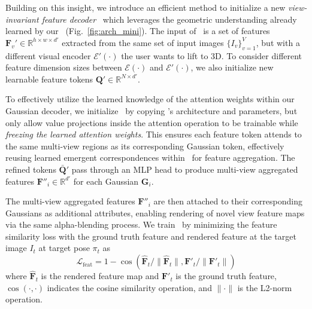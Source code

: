Building on this insight, we introduce an efficient method to initialize a new \textit{view-invariant feature decoder} \oursF\, which leverages the geometric understanding already learned by our \ours~(Fig.~\ref{fig:arch_mini}). The input of \oursF\ is a set of features $\mathbf{F}_v' \in \mathbb{R}^{h \times w \times d'}$ extracted from the same set of input images $\{I_v\}_{v=1}^V$, but with a different visual encoder $\mathcal{E}'(\cdot)$ the user wants to lift to 3D. To consider different feature dimension sizes between $\mathcal{E}(\cdot)$ and $\mathcal{E}'(\cdot)$, we also initialize new learnable feature tokens $\mathbf{Q}' \in \mathbb{R}^{N \times d'}$. 

To effectively utilize the learned knowledge of the attention weights within our Gaussian decoder, we initialize \oursF\ by copying \ours's architecture and parameters, but only allow value projections inside the attention operation to be trainable while \textit{freezing the learned attention weights}. This ensures each feature token attends to the same multi-view regions as its corresponding Gaussian token, effectively reusing learned emergent correspondences within \ours\ for feature aggregation. The refined tokens $\bar{\mathbf{Q}}'$ pass through an MLP head to produce multi-view aggregated features $\mathbf{F}''_i \in \mathbb{R}^{d'}$ for each Gaussian $\mathbf{G}_i$.

The multi-view aggregated features $\mathbf{F}''_i$ are then attached to their corresponding Gaussians as additional attributes, enabling rendering of novel view feature maps via the same alpha-blending process. We train \oursF\ by minimizing the feature similarity loss with the ground truth feature and rendered feature at the target image $I_t$ at target pose $\pi_t$ as
\begin{equation}
\mathcal{L}_\text{feat} = 1 - \cos(\hat{\mathbf{F}}_t/\|\hat{\mathbf{F}}_t\|,
\mathbf{F}'_t/\|\mathbf{F}'_t\|
)\end{equation}
where $\hat{\mathbf{F}}_t$ is the rendered feature map and $\mathbf{F}'_t$ is the ground truth feature, $\cos(\cdot,\cdot)$ indicates the cosine similarity operation, and $\|\cdot\|$ is the L2-norm operation.